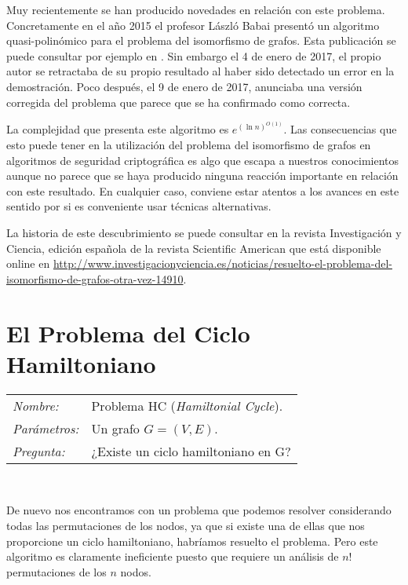 Muy recientemente se han producido novedades en relaci\'on con este problema. Concretamente
en el a\~no 2015 el profesor László Babai present\'o un algoritmo quasi-polin\'omico para
el problema del isomorfismo de grafos. Esta publicaci\'on se puede consultar por ejemplo en \cite{babai}.
Sin embargo el 4 de enero de 2017, el propio autor se retractaba de su propio resultado al haber sido
detectado un error en la demostraci\'on. Poco despu\'es, el 9 de enero de 2017, anunciaba una versi\'on
corregida del problema que parece que se ha confirmado como correcta.

La complejidad que presenta este algoritmo es $e^{(\ln n)^{O(1)}}$. Las consecuencias que esto puede
tener en la utilizaci\'on del problema del isomorfismo de grafos en algoritmos de seguridad criptogr\'afica
es algo que escapa a nuestros conocimientos aunque no parece que se haya producido ninguna reacci\'on
importante en relaci\'on con este resultado. En cualquier caso, conviene estar atentos a los avances
en este sentido por si es conveniente usar t\'ecnicas alternativas.

La historia de este descubrimiento se puede consultar en la revista Investigaci\'on y Ciencia,
edici\'on espa\~nola de la
revista Scientific American que est\'a disponible online en
\url{http://www.investigacionyciencia.es/noticias/resuelto-el-problema-del-isomorfismo-de-grafos-otra-vez-14910}.

\hfil

\section{El Problema del Ciclo Hamiltoniano}

\hfil

\begin{tabular}{|ll}
	\textit{Nombre:} & Problema HC ({\em Hamiltonial Cycle}). \\
	\textit{Parámetros:} & Un grafo $G=(V,E)$. \\
	\textit{Pregunta:} & ¿Existe un ciclo hamiltoniano en G? \\
\end{tabular}
\\

\hfil

De nuevo nos encontramos con un problema que podemos resolver considerando todas
las permutaciones de los nodos, ya que si existe una de ellas que nos proporcione
un ciclo hamiltoniano, habr\'iamos resuelto el problema. Pero este algoritmo es
claramente ineficiente puesto que requiere un an\'alisis de $n!$ permutaciones de los
$n$ nodos.

